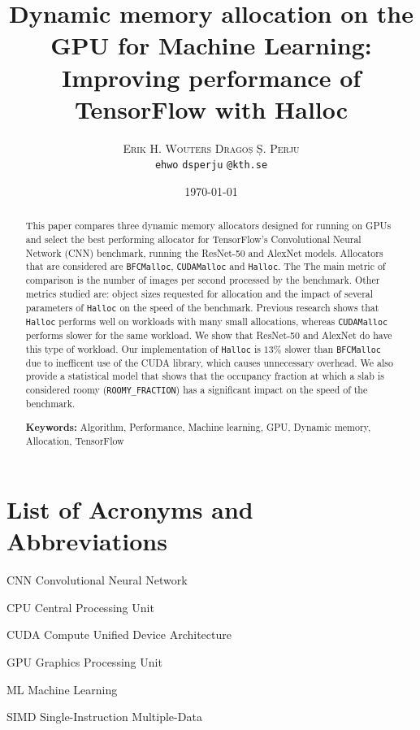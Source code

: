 \documentclass[12pt,twoside]{article}
\title{Dynamic memory allocation on the GPU for Machine Learning: Improving performance of TensorFlow with Halloc}
\author{
        \textsc{Erik H. Wouters}
            \qquad
        \textsc{Dragoș Ș. Perju} %
        \mbox{}\\
        \normalsize
            \texttt{ehwo}
        \textbar{}
            \texttt{dsperju}
        \normalsize
            \texttt{@kth.se}
}
\date{\today}
\begin{document}

\maketitle

\begin{abstract}
\label{sec:abstract}

This paper compares three dynamic memory allocators designed for running on GPUs and select the best performing allocator for TensorFlow’s Convolutional Neural Network (CNN) benchmark, running the ResNet-50 and AlexNet models. Allocators that are considered are \texttt{BFCMalloc}, \texttt{CUDAMalloc} and \texttt{Halloc}. The The main metric of comparison is the number of images per second processed by the benchmark. Other metrics studied are: object sizes requested for allocation and the impact of several parameters of \texttt{Halloc} on the speed of the benchmark. Previous research shows that \texttt{Halloc} performs well on workloads with many small allocations, whereas \texttt{CUDAMalloc} performs slower for the same workload\cite{Vinkler2015}. We show that ResNet-50 and AlexNet do have this type of workload. Our implementation of \texttt{Halloc} is $13\%$ slower than \texttt{BFCMalloc} due to inefficent use of the CUDA library, which causes unnecessary overhead. We also provide a statistical model that shows that the occupancy fraction at which a slab is considered roomy (\texttt{ROOMY\_FRACTION}) has a significant impact on the speed of the benchmark.


\textbf{Keywords:} Algorithm, Performance, Machine learning, GPU, Dynamic memory, Allocation, TensorFlow

\end{abstract}

\tableofcontents

\section*{List of Acronyms and Abbreviations}
\label{list-of-acronyms-and-abbreviations}

\begin{basedescript}{\desclabelstyle{\pushlabel}\desclabelwidth{10em}}
\item[CNN]					Convolutional Neural Network
\item[CPU]                  Central Processing Unit
\item[CUDA]                 Compute Unified Device Architecture
\item[GPU]                  Graphics Processing Unit
\item[ML]                   Machine Learning
\item[SIMD]                 Single-Instruction Multiple-Data
\end{basedescript}
\end{document}
